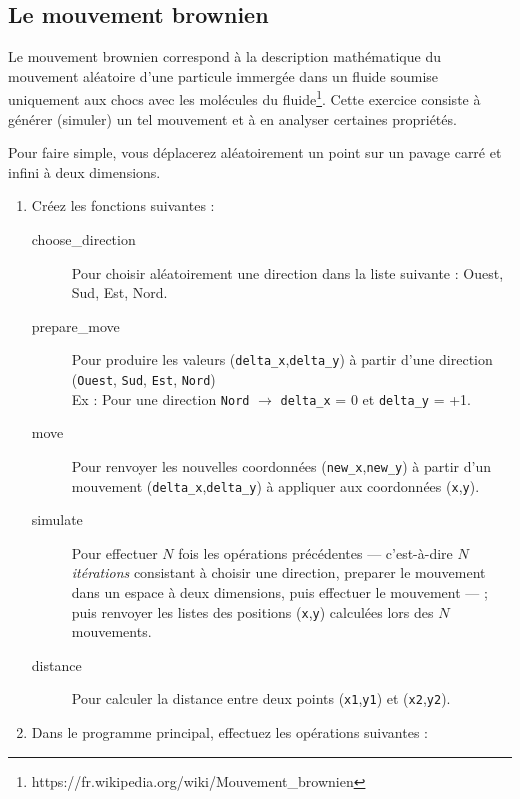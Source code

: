 \subsection{Le mouvement brownien}

Le  mouvement brownien  correspond  à la  description mathématique  du
mouvement  aléatoire d'une  particule immergée  dans un  fluide soumise
uniquement      aux     chocs      avec      les     molécules      du
fluide\footnote{https://fr.wikipedia.org/wiki/Mouvement\_brownien}. 
Cette exercice consiste à générer (simuler) un tel mouvement et à en
analyser certaines propriétés.


Pour  faire simple,  vous déplacerez  aléatoirement un  point
sur un pavage carré et infini à deux dimensions.


\begin{enumerate}
\item Créez les fonctions suivantes :
  \begin{description}
  \item[choose\_direction]  Pour choisir  aléatoirement une  direction
    dans la liste suivante : Ouest, Sud, Est, Nord.
  \item[prepare\_move]     Pour      produire     les     valeurs
    (\texttt{delta\_x},\texttt{delta\_y})  à partir  d'une direction  
    (\texttt{Ouest}, \texttt{Sud},  \texttt{Est},
    \texttt{Nord})\\ Ex : Pour une direction \texttt{Nord} $\rightarrow$ \texttt{delta\_x} = 0 et
    \texttt{delta\_y} = +1.
  \item[move] Pour renvoyer  les nouvelles coordonnées 
    (\texttt{new\_x},\texttt{new\_y})
    à partir  d'un mouvement (\texttt{delta\_x},\texttt{delta\_y})
     à  appliquer aux
    coordonnées (\texttt{x},\texttt{y}).
  \item[simulate]  Pour effectuer  $N$ fois  les opérations  précédentes ---
    c'est-à-dire $N$ \emph{itérations}  consistant à choisir  une
    direction, preparer le mouvement dans  un espace à deux dimensions,
    puis  effectuer  le  mouvement --- ; puis  renvoyer  les  listes  des
    positions (\texttt{x},\texttt{y}) calculées lors des $N$ mouvements.
  \item[distance] Pour calculer la  distance entre deux points 
    (\texttt{x1},\texttt{y1})
    et (\texttt{x2},\texttt{y2}).
  \end{description}
\item Dans le programme  principal, effectuez les opérations suivantes
  :
  \begin{itemize}

\end{itemize}
\end{enumerate}

